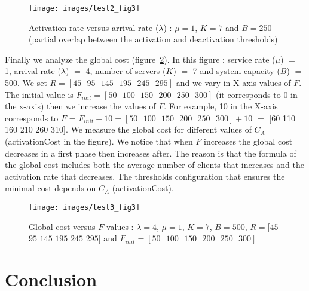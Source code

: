 \documentclass[conference]{IEEEtran}
\begin{document}
\begin{figure}[h]
\centering
\texttt{[image: images/test2\_fig3]}
\caption{Activation rate versus arrival rate ($\lambda$) : $\mu=1$, $K=7$ and $B=250$ (partial overlap between the activation and deactivation thresholds)}
\label{fig:image-chap4-1_par_1_test2_fig3}
\end{figure}

Finally we analyze the global cost (figure~\ref{fig:image-chap4-1_par_1_test3_fig3}). In this figure : service rate ($\mu$) $=$ 1, arrival rate ($\lambda$) $=$ 4, number of servers ($K$) $=$ 7 and system capacity ($B$) $=$ 500. We set $R=[45\mbox{ }95\mbox{ }145\mbox{ }195\mbox{ }245\mbox{ }295]$ and we vary in X-axis values of $F$. The initial value is $F_{init}=[50\mbox{ }100\mbox{ }150\mbox{ }200\mbox{ }250\mbox{ }300]$ (it corresponds to 0 in the x-axis) then we increase the values of $F$. For example, 10 in the X-axis corresponds to $F$ = $F_{init}+10=[50\mbox{ }100\mbox{ }150\mbox{ }200\mbox{ }250\mbox{ }300]+10$ $=$ [60 110 160 210 260 310]. We measure the global cost for different values of $C_{A}$ (activationCost in the figure). We notice that when $F$ increases the global cost decreases in a first phase then increases after. The reason is that the formula of the global cost includes both the average number of clients that increases and the activation rate that decreases. The thresholds configuration that ensures the minimal cost depends on $C_{A}$ (activationCost).

\begin{figure}[hbtp]
\centering
\texttt{[image: images/test3\_fig3]}
\caption{Global cost versus $F$ values : $\lambda=4$,  $\mu=1$, $K=7$, $B=500$, $R=[45$ $95$ $145$ $195$ $245$ $295]$ and $F_{init}=[50\mbox{ }100\mbox{ }150\mbox{ }200\mbox{ }250\mbox{ }300]$}
\label{fig:image-chap4-1_par_1_test3_fig3}
\end{figure}

\section{Conclusion}








\end{document}
